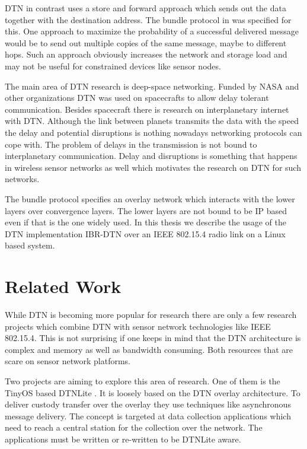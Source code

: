 DTN in contrast uses a store and forward approach which sends out the data
together with the destination address. The bundle protocol in
\cite{RFC5050} was specified for this. One approach to maximize the probability
of a successful delivered message would be to send out multiple copies of the
same message, maybe to different hops. Such an approach obviously increases the
network and storage load and may not be useful for constrained devices like
sensor nodes.

The main area of DTN research is deep-space networking. Funded by NASA and other
organizations DTN was used on spacecrafts to allow delay tolerant communication.
Besides spacecraft there is research on interplanetary internet with DTN.
Although the link between planets transmits the data with the speed the delay
and potential disruptions is nothing nowadays networking protocols can cope
with. The problem of delays in the transmission is not bound to interplanetary
communication. Delay and disruptions is something that happens in wireless
sensor networks as well which motivates the research on DTN for such networks.

The bundle protocol specifies an overlay network which interacts with the lower
layers over convergence layers. The lower layers are not bound to be IP
based even if that is the one widely used. In this thesis we describe the usage
of the DTN implementation IBR-DTN over an IEEE 802.15.4 radio link on a Linux
based system.

\section{Related Work}
\label{relatedwork}

While DTN is becoming more popular for research there are only a few research
projects which combine DTN with sensor network technologies like IEEE 802.15.4.
This is not surprising if one keeps in mind that the DTN architecture is
complex and memory as well as bandwidth consuming. Both resources that are scare
on sensor network platforms.

Two projects are aiming to explore this area of research. One of them is the
TinyOS based DTNLite \cite{dtnlite}. It is loosely based on the DTN overlay
architecture. To deliver custody transfer over the overlay they use techniques
like asynchronous message delivery. The concept is targeted at data collection
applications which need to reach a central station for the collection over the
network. The applications must be written or re-written to be DTNLite aware.

